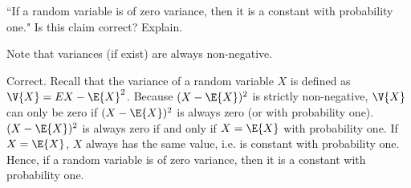 	\begin{exercise}\label{ex:chap06:05}
		``If a random variable is of zero variance, then it is a constant with probability one." Is this claim correct? Explain.
		\begin{hint}
			Note that variances (if exist) are always non-negative.
		\end{hint}
		\begin{solution}
			Correct. Recall that the variance of a random variable $X$ is defined as $\V{X} = E{X - \E{X}}^2$. Because $(X - \E{X})^2$ is strictly non-negative, $\V{X}$ can only be zero if $(X - \E{X})^2$ is always zero (or with probability one). $(X - \E{X})^2$ is always zero if and only if $X = \E{X}$ with probability one. If $X = \E{X}$, $X$ always has the same value, i.e. is constant with probability one. Hence, if a random variable is of zero variance, then it is a constant with probability one.
		\end{solution}
	\end{exercise}

